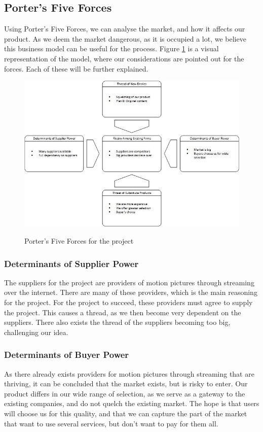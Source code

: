 \subsection{Porter's Five Forces}

Using Porter's Five Forces, we can analyse the market, and how it affects our product. As we deem the market dangerous, as it is occupied a lot, we believe this business model can be useful for the process. Figure \ref{fig:five_forces} is a visual representation of the model, where our considerations are pointed out for the forces. Each of these will be further explained.

\begin{figure}[h]
    \begin{center}
        \includegraphics[scale=0.65]{./pics/five_forces}
        \label{fig:five_forces}
        \caption{Porter's Five Forces for the project}
    \end{center}
\end{figure}

\subsubsection*{Determinants of Supplier Power}
The suppliers for the project are providers of motion pictures through streaming over the internet. There are many of these providers, which is the main reasoning for the project. For the project to succeed, these providers must agree to supply the project. This causes a thread, as we then become very dependent on the suppliers. There also exists the thread of the suppliers becoming too big, challenging our idea.

\subsubsection*{Determinants of Buyer Power}
As there already exists providers for motion pictures through streaming that are thriving, it can be concluded that the market exists, but is risky to enter. Our product differs in our wide range of selection, as we serve as a gateway to the existing companies, and do not quelch the existing market. The hope is that users will choose us for this quality, and that we can capture the part of the market that want to use several services, but don't want to pay for them all.


